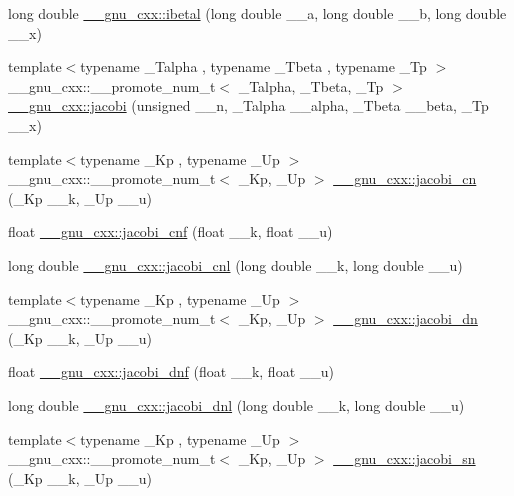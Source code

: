 \begin{DoxyCompactItemize}
\item 
long double \hyperlink{group__gnu__math__spec__func_ga5c9c5b583e4f1c9785a1c4582551c97f}{\+\_\+\+\_\+gnu\+\_\+cxx\+::ibetal} (long double \+\_\+\+\_\+a, long double \+\_\+\+\_\+b, long double \+\_\+\+\_\+x)
\item 
{\footnotesize template$<$typename \+\_\+\+Talpha , typename \+\_\+\+Tbeta , typename \+\_\+\+Tp $>$ }\\\+\_\+\+\_\+gnu\+\_\+cxx\+::\+\_\+\+\_\+promote\+\_\+num\+\_\+t$<$ \+\_\+\+Talpha, \+\_\+\+Tbeta, \+\_\+\+Tp $>$ \hyperlink{group__gnu__math__spec__func_gac7be4bf3c7588f932ce754ee340d0338}{\+\_\+\+\_\+gnu\+\_\+cxx\+::jacobi} (unsigned \+\_\+\+\_\+n, \+\_\+\+Talpha \+\_\+\+\_\+alpha, \+\_\+\+Tbeta \+\_\+\+\_\+beta, \+\_\+\+Tp \+\_\+\+\_\+x)
\item 
{\footnotesize template$<$typename \+\_\+\+Kp , typename \+\_\+\+Up $>$ }\\\+\_\+\+\_\+gnu\+\_\+cxx\+::\+\_\+\+\_\+promote\+\_\+num\+\_\+t$<$ \+\_\+\+Kp, \+\_\+\+Up $>$ \hyperlink{group__gnu__math__spec__func_gaa49fc22cc0f9dde812bab5147fad23ca}{\+\_\+\+\_\+gnu\+\_\+cxx\+::jacobi\+\_\+cn} (\+\_\+\+Kp \+\_\+\+\_\+k, \+\_\+\+Up \+\_\+\+\_\+u)
\item 
float \hyperlink{group__gnu__math__spec__func_gadbd6320123f45ae10d539cf8df0373cd}{\+\_\+\+\_\+gnu\+\_\+cxx\+::jacobi\+\_\+cnf} (float \+\_\+\+\_\+k, float \+\_\+\+\_\+u)
\item 
long double \hyperlink{group__gnu__math__spec__func_ga08892965ea520116cc53a764513fe685}{\+\_\+\+\_\+gnu\+\_\+cxx\+::jacobi\+\_\+cnl} (long double \+\_\+\+\_\+k, long double \+\_\+\+\_\+u)
\item 
{\footnotesize template$<$typename \+\_\+\+Kp , typename \+\_\+\+Up $>$ }\\\+\_\+\+\_\+gnu\+\_\+cxx\+::\+\_\+\+\_\+promote\+\_\+num\+\_\+t$<$ \+\_\+\+Kp, \+\_\+\+Up $>$ \hyperlink{group__gnu__math__spec__func_ga2be54b9c153b58a85d5ed9f1d0a02e21}{\+\_\+\+\_\+gnu\+\_\+cxx\+::jacobi\+\_\+dn} (\+\_\+\+Kp \+\_\+\+\_\+k, \+\_\+\+Up \+\_\+\+\_\+u)
\item 
float \hyperlink{group__gnu__math__spec__func_gae96327d678adc6b5c4051f1c3649549a}{\+\_\+\+\_\+gnu\+\_\+cxx\+::jacobi\+\_\+dnf} (float \+\_\+\+\_\+k, float \+\_\+\+\_\+u)
\item 
long double \hyperlink{group__gnu__math__spec__func_gae59786991abbf8359deef49b6323065a}{\+\_\+\+\_\+gnu\+\_\+cxx\+::jacobi\+\_\+dnl} (long double \+\_\+\+\_\+k, long double \+\_\+\+\_\+u)
\item 
{\footnotesize template$<$typename \+\_\+\+Kp , typename \+\_\+\+Up $>$ }\\\+\_\+\+\_\+gnu\+\_\+cxx\+::\+\_\+\+\_\+promote\+\_\+num\+\_\+t$<$ \+\_\+\+Kp, \+\_\+\+Up $>$ \hyperlink{group__gnu__math__spec__func_gad7e60d39a8b57a427eb8ca31c8d09e10}{\+\_\+\+\_\+gnu\+\_\+cxx\+::jacobi\+\_\+sn} (\+\_\+\+Kp \+\_\+\+\_\+k, \+\_\+\+Up \+\_\+\+\_\+u)

\end{DoxyCompactItemize}
